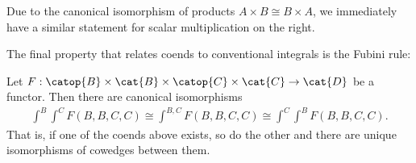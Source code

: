 Due to the canonical isomorphism of products $A\times B\cong B\times A$,
we immediately have a similar statement for scalar multiplication on the right.

The final property that relates coends to conventional integrals is
the Fubini rule:

\begin{theorem}\label{thm:fubini}
  Let $F:\catop{B}\times\cat{B}\times\catop{C}\times\cat{C}\to\cat{D}$ be a functor.
  Then there are canonical isomorphisms
  \begin{align*}
    \int^{B}\int^{C} F(B,B,C,C)
    \cong \int^{B,C} F(B,B,C,C)
    \cong \int^{C}\int^{B} F(B,B,C,C).
  \end{align*}
  That is, if one of the coends above exists, so do the other and there are
  unique isomorphisms of cowedges between them.
\end{theorem}

